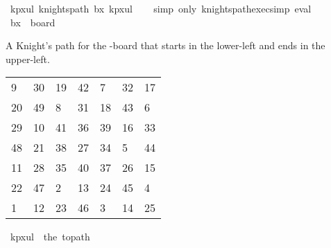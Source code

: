 \begin{isabellebody}
\isamarkupfalse%
\ kp{\isacharunderscore}{\kern0pt}{}x{}{\isacharunderscore}{\kern0pt}ul{\isacharcolon}{\kern0pt}\ {\isachardoublequoteopen}knights{\isacharunderscore}{\kern0pt}path\ b{}x{}\ kp{}x{}ul{\isachardoublequoteclose}\isanewline
%
\isadelimproof
\ \ %
\endisadelimproof
%
\isatagproof
{}\isamarkupfalse%
\ {\isacharparenleft}{\kern0pt}simp\ only{\isacharcolon}{\kern0pt}\ knights{\isacharunderscore}{\kern0pt}path{\isacharunderscore}{\kern0pt}exec{\isacharunderscore}{\kern0pt}simp{\isacharparenright}{\kern0pt}\ eval%
\endisatagproof
{\isafoldproof}%
%
\isadelimproof
\isanewline
%
\endisadelimproof
\isanewline
{}\isamarkupfalse%
\ {\isachardoublequoteopen}b{}x{}\ {\isasymequiv}\ board\ {}\ {}{\isachardoublequoteclose}%
\begin{isamarkuptext}%
A Knight's path for the -board that starts in the lower-left and ends in the 
upper-left.
  \begin{table}[H]
    \begin{tabular}{lllllll}
       9 & 30 & 19 & 42 &  7 & 32 & 17 \\
      20 & 49 &  8 & 31 & 18 & 43 &  6 \\
      29 & 10 & 41 & 36 & 39 & 16 & 33 \\
      48 & 21 & 38 & 27 & 34 &  5 & 44 \\
      11 & 28 & 35 & 40 & 37 & 26 & 15 \\
      22 & 47 &  2 & 13 & 24 & 45 &  4 \\
       1 & 12 & 23 & 46 &  3 & 14 & 25
    \end{tabular}
  \end{table}%
\end{isamarkuptext}\isamarkuptrue%
\isamarkupfalse%
\ {\isachardoublequoteopen}kp{}x{}ul\ {\isasymequiv}\ the\ {\isacharparenleft}{\kern0pt}to{\isacharunderscore}{\kern0pt}path\ \isanewline
\ \ {\isacharbrackleft}{\kern0pt}{\isacharbrackleft}{\kern0pt}{}{\isacharcomma}{\kern0pt}{}{}{\isacharcomma}{\kern0pt}{}{}{\isacharcomma}{\kern0pt}{}{}{\isacharcomma}{\kern0pt}{}{\isacharcomma}{\kern0pt}{}{}{\isacharcomma}{\kern0pt}{}{}{\isacharbrackright}{\kern0pt}{\isacharcomma}{\kern0pt}\isanewline

\end{isabellebody}
